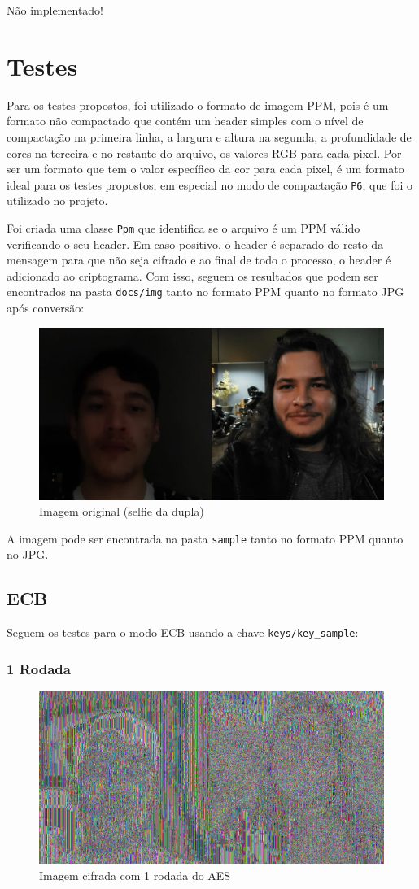\documentclass[12pt]{article}
\begin{document}
Não implementado!

\section{Testes}
Para os testes propostos, foi utilizado o formato de imagem PPM, pois é um formato não compactado que contém um header simples com o nível de compactação na primeira linha, a largura e altura na segunda, a profundidade de cores na terceira e no restante do arquivo, os valores RGB para cada pixel. Por ser um formato que tem o valor específico da cor para cada pixel, é um formato ideal para os testes propostos, em especial no modo de compactação \texttt{P6}, que foi o utilizado no projeto.

Foi criada uma classe \texttt{Ppm} que identifica se o arquivo é um PPM válido verificando o seu header. Em caso positivo, o header é separado do resto da mensagem para que não seja cifrado e ao final de todo o processo, o header é adicionado ao criptograma. Com isso, seguem os resultados que podem ser encontrados na pasta \texttt{docs/img} tanto no formato PPM quanto no formato JPG após conversão:

\begin{figure}[H]
	\centering
    \includegraphics[width=.5\textwidth]{../sample/dupla.jpg}
    \caption{Imagem original (selfie da dupla)}
\end{figure}

A imagem pode ser encontrada na pasta \texttt{sample} tanto no formato PPM quanto no JPG.

\subsection{ECB}

Seguem os testes para o modo ECB usando a chave \texttt{keys/key\_sample}:

\subsubsection{1 Rodada}

\begin{figure}[H]
	\centering
    \includegraphics[width=.5\textwidth]{img/ecb1.jpg}
    \caption{Imagem cifrada com 1 rodada do AES}
\end{figure}
\end{document}
